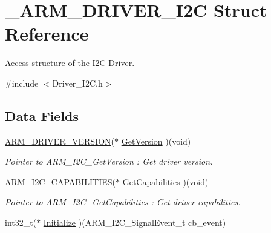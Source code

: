 \hypertarget{struct___a_r_m___d_r_i_v_e_r___i2_c}{}\section{\+\_\+\+A\+R\+M\+\_\+\+D\+R\+I\+V\+E\+R\+\_\+\+I2C Struct Reference}
\label{struct___a_r_m___d_r_i_v_e_r___i2_c}


Access structure of the I2C Driver.  




{\ttfamily \#include $<$Driver\+\_\+\+I2\+C.\+h$>$}

\subsection*{Data Fields}
\begin{DoxyCompactItemize}
\item 
\mbox{\label{struct___a_r_m___d_r_i_v_e_r___i2_c_a30afd9cb3113c037b5f1926f5ef93b59}} 
\mbox{\hyperlink{struct___a_r_m___d_r_i_v_e_r___v_e_r_s_i_o_n}{A\+R\+M\+\_\+\+D\+R\+I\+V\+E\+R\+\_\+\+V\+E\+R\+S\+I\+ON}}($\ast$ \mbox{\hyperlink{struct___a_r_m___d_r_i_v_e_r___i2_c_a30afd9cb3113c037b5f1926f5ef93b59}{Get\+Version}} )(void)
\begin{DoxyCompactList}\small\item\em Pointer to A\+R\+M\+\_\+\+I2\+C\+\_\+\+Get\+Version \+: Get driver version. \end{DoxyCompactList}\item 
\mbox{\label{struct___a_r_m___d_r_i_v_e_r___i2_c_a00ae4a98ad86ab27e1dd1373d6adda44}} 
\mbox{\hyperlink{struct___a_r_m___i2_c___c_a_p_a_b_i_l_i_t_i_e_s}{A\+R\+M\+\_\+\+I2\+C\+\_\+\+C\+A\+P\+A\+B\+I\+L\+I\+T\+I\+ES}}($\ast$ \mbox{\hyperlink{struct___a_r_m___d_r_i_v_e_r___i2_c_a00ae4a98ad86ab27e1dd1373d6adda44}{Get\+Capabilities}} )(void)
\begin{DoxyCompactList}\small\item\em Pointer to A\+R\+M\+\_\+\+I2\+C\+\_\+\+Get\+Capabilities \+: Get driver capabilities. \end{DoxyCompactList}\item 
\mbox{\label{struct___a_r_m___d_r_i_v_e_r___i2_c_aea6628b98ef11038df8d6095aad04f35}} 
int32\+\_\+t($\ast$ \mbox{\hyperlink{struct___a_r_m___d_r_i_v_e_r___i2_c_aea6628b98ef11038df8d6095aad04f35}{Initialize}} )(A\+R\+M\+\_\+\+I2\+C\+\_\+\+Signal\+Event\+\_\+t cb\+\_\+event)

\end{DoxyCompactItemize}
